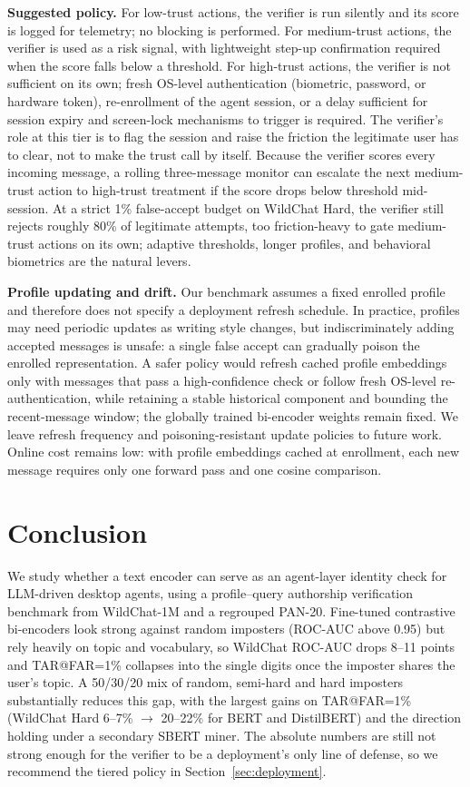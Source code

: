 \documentclass[11pt]{article}
\begin{document}
\noindent\textbf{Suggested policy.} For low-trust actions, the verifier is run silently and its score is logged for telemetry; no blocking is performed. For medium-trust actions, the verifier is used as a risk signal, with lightweight step-up confirmation required when the score falls below a threshold. For high-trust actions, the verifier is not sufficient on its own; fresh OS-level authentication (biometric, password, or hardware token), re-enrollment of the agent session, or a delay sufficient for session expiry and screen-lock mechanisms to trigger is required. The verifier's role at this tier is to flag the session and raise the friction the legitimate user has to clear, not to make the trust call by itself. Because the verifier scores every incoming message, a rolling three-message monitor can escalate the next medium-trust action to high-trust treatment if the score drops below threshold mid-session. At a strict 1\% false-accept budget on WildChat Hard, the verifier still rejects roughly 80\% of legitimate attempts, too friction-heavy to gate medium-trust actions on its own; adaptive thresholds, longer profiles, and behavioral biometrics are the natural levers.

\noindent\textbf{Profile updating and drift.} Our benchmark assumes a fixed enrolled profile and therefore does not specify a deployment refresh schedule. In practice, profiles may need periodic updates as writing style changes, but indiscriminately adding accepted messages is unsafe: a single false accept can gradually poison the enrolled representation. A safer policy would refresh cached profile embeddings only with messages that pass a high-confidence check or follow fresh OS-level re-authentication, while retaining a stable historical component and bounding the recent-message window; the globally trained bi-encoder weights remain fixed. We leave refresh frequency and poisoning-resistant update policies to future work. Online cost remains low: with profile embeddings cached at enrollment, each new message requires only one forward pass and one cosine comparison.

\section{Conclusion}
\label{sec:conclusion}

We study whether a text encoder can serve as an agent-layer identity check for LLM-driven desktop agents, using a profile–query authorship verification benchmark from WildChat-1M and a regrouped PAN-20. Fine-tuned contrastive bi-encoders look strong against random imposters (ROC-AUC above 0.95) but rely heavily on topic and vocabulary, so WildChat ROC-AUC drops 8--11 points and TAR@FAR=1\% collapses into the single digits once the imposter shares the user's topic. A 50/30/20 mix of random, semi-hard and hard imposters substantially reduces this gap, with the largest gains on TAR@FAR=1\% (WildChat Hard 6--7\% $\to$ 20--22\% for BERT and DistilBERT) and the direction holding under a secondary SBERT miner. The absolute numbers are still not strong enough for the verifier to be a deployment's only line of defense, so we recommend the tiered policy in Section~\ref{sec:deployment}.
\end{document}
